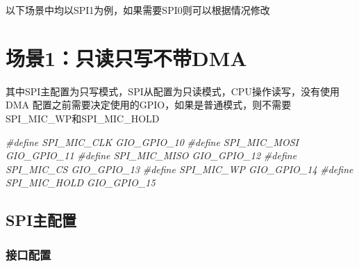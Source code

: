 \documentclass[
  12pt,
]{book}
\newenvironment{Shaded}{\begin{snugshade}}{\end{snugshade}}
\newcommand{\PreprocessorTok}[1]{\textcolor[rgb]{0.56,0.35,0.01}{\textit{#1}}}
\begin{document}
以下场景中均以SPI1为例，如果需要SPI0则可以根据情况修改

\hypertarget{ux573aux666f1ux53eaux8bfbux53eaux5199ux4e0dux5e26dma}{%
\section{场景1：只读只写不带DMA}\label{ux573aux666f1ux53eaux8bfbux53eaux5199ux4e0dux5e26dma}}

其中SPI主配置为只写模式，SPI从配置为只读模式，CPU操作读写，没有使用DMA 配置之前需要决定使用的GPIO，如果是普通模式，则不需要SPI\_MIC\_WP和SPI\_MIC\_HOLD

\begin{Shaded}
\begin{Highlighting}[]
\PreprocessorTok{#define SPI_MIC_CLK         GIO_GPIO_10}
\PreprocessorTok{#define SPI_MIC_MOSI        GIO_GPIO_11}
\PreprocessorTok{#define SPI_MIC_MISO        GIO_GPIO_12}
\PreprocessorTok{#define SPI_MIC_CS          GIO_GPIO_13}
\PreprocessorTok{#define SPI_MIC_WP          GIO_GPIO_14}
\PreprocessorTok{#define SPI_MIC_HOLD        GIO_GPIO_15}
\end{Highlighting}
\end{Shaded}

\hypertarget{spiux4e3bux914dux7f6e}{%
\subsection{SPI主配置}\label{spiux4e3bux914dux7f6e}}

\hypertarget{ux63a5ux53e3ux914dux7f6e}{%
\subsubsection{接口配置}\label{ux63a5ux53e3ux914dux7f6e}}
\end{document}
